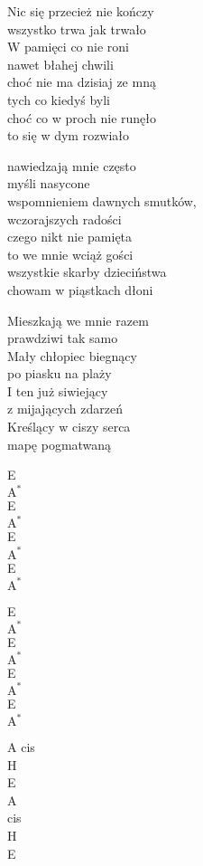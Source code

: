 \begin{text}
    Nic się przecież nie kończy\\
    wszystko trwa jak trwało\\
    W pamięci co nie roni\\
    nawet błahej chwili    \\
    choć nie ma dzisiaj ze mną\\
    tych co kiedyś byli\\
    choć co w proch nie runęło\\
    to się w dym rozwiało

    nawiedzają mnie często\\
    myśli nasycone\\
    wspomnieniem dawnych smutków,\\
    wczorajszych radości\\
    czego nikt nie pamięta\\
    to we mnie wciąż gości\\
    wszystkie skarby dzieciństwa\\
    chowam w piąstkach dłoni

    Mieszkają we mnie razem\\
    prawdziwi tak samo\\
    Mały chłopiec biegnący\\
    po piasku na plaży\\
    I ten już siwiejący\\
    z mijających zdarzeń\\
    Kreślący w ciszy serca\\
    mapę pogmatwaną
\end{text}
\begin{chord}
    E\\
    $\mathrm{A^{*}}$\\
    E\\
    $\mathrm{A^{*}}$\\
    E\\
    $\mathrm{A^{*}}$\\
    E\\
    $\mathrm{A^{*}}$

    E\\
    $\mathrm{A^{*}}$\\
    E\\
    $\mathrm{A^{*}}$\\
    E\\
    $\mathrm{A^{*}}$\\
    E\\
    $\mathrm{A^{*}}$

    A cis\\
    H\\
    E\\
    A\\
    cis\\
    H\\
    E

\end{chord}
